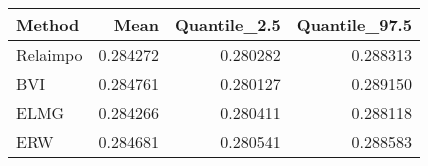 \begin{table}[ht]
\centering
\begin{tabular}{lrrr}
  \hline
Method & Mean & Quantile\_2.5 & Quantile\_97.5 \\ 
  \hline
Relaimpo & 0.284272 & 0.280282 & 0.288313 \\ 
  BVI & 0.284761 & 0.280127 & 0.289150 \\ 
  ELMG & 0.284266 & 0.280411 & 0.288118 \\ 
  ERW & 0.284681 & 0.280541 & 0.288583 \\ 
   \hline
\end{tabular}
\end{table}
